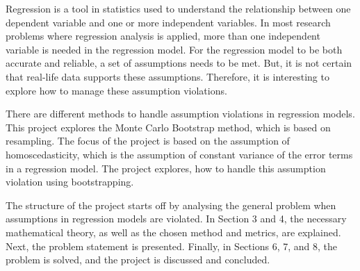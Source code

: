 
Regression is a tool in statistics used to understand the relationship between one dependent variable and one or more independent variables. In most research problems where regression analysis is applied, more than one independent variable is needed in the regression model. For the regression model to be both accurate and reliable, a set of assumptions needs to be met. But, it is not certain that real-life data supports these assumptions. Therefore, it is interesting to explore how to manage these assumption violations. \newline

\noindent There are different methods to handle assumption violations in regression models. This project explores the  Monte Carlo Bootstrap method, which is based on resampling. The focus of the project is based on the assumption of homoscedasticity, which is the assumption of constant variance of the error terms in a regression model. The project explores, how to handle this assumption violation using bootstrapping.\newline

\noindent The structure of the project starts off by analysing the general problem when assumptions in regression models are violated. In Section 3 and 4, the necessary mathematical theory, as well as the chosen method and metrics, are explained. Next, the problem statement is presented. Finally, in Sections 6, 7, and 8, the problem is solved, and the project is discussed and concluded.